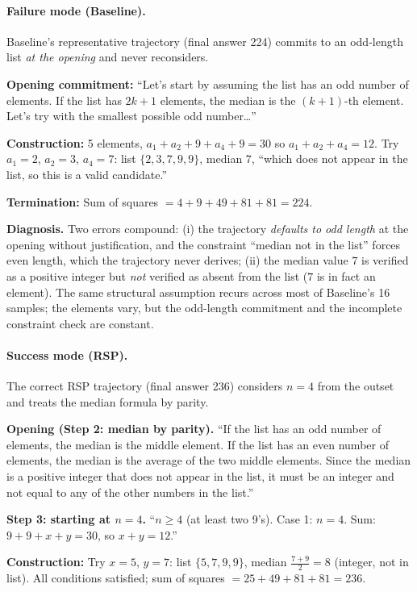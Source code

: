 \paragraph{Failure mode (Baseline).} Baseline's representative trajectory (final answer 224) commits to an odd-length list \emph{at the opening} and never reconsiders.

\begin{tcolorbox}[colback=gray!5, colframe=black!60, arc=3pt, boxrule=0.5pt, fontupper=\footnotesize, breakable, title={Baseline trajectory (final answer 224) --- excerpts}]
\textbf{Opening commitment:} ``Let's start by assuming the list has an odd number of elements. If the list has $2k+1$ elements, the median is the $(k+1)$-th element. Let's try with the smallest possible odd number\dots''

\textbf{Construction:} 5 elements, $a_1 + a_2 + 9 + a_4 + 9 = 30$ so $a_1 + a_2 + a_4 = 12$. Try $a_1 = 2$, $a_2 = 3$, $a_4 = 7$: list $\{2, 3, 7, 9, 9\}$, median $7$, ``which does not appear in the list, so this is a valid candidate.''

\textbf{Termination:} Sum of squares $= 4 + 9 + 49 + 81 + 81 = \boxed{224}$.
\end{tcolorbox}

\textbf{Diagnosis.} Two errors compound: (i) the trajectory \emph{defaults to odd length} at the opening without justification, and the constraint ``median not in the list'' forces even length, which the trajectory never derives; (ii) the median value $7$ is verified as a positive integer but \emph{not} verified as absent from the list ($7$ is in fact an element). The same structural assumption recurs across most of Baseline's 16 samples; the elements vary, but the odd-length commitment and the incomplete constraint check are constant.

\paragraph{Success mode (RSP).} The correct RSP trajectory (final answer 236) considers $n = 4$ from the outset and treats the median formula by parity.

\begin{tcolorbox}[colback=gray!5, colframe=black!60, arc=3pt, boxrule=0.5pt, fontupper=\footnotesize, breakable, title={RSP trajectory (final answer 236) --- excerpts}]
\textbf{Opening (Step 2: median by parity).} ``If the list has an odd number of elements, the median is the middle element. If the list has an even number of elements, the median is the average of the two middle elements. Since the median is a positive integer that does not appear in the list, it must be an integer and not equal to any of the other numbers in the list.''

\textbf{Step 3: starting at $n = 4$.} ``$n \ge 4$ (at least two 9's). Case 1: $n = 4$. Sum: $9 + 9 + x + y = 30$, so $x + y = 12$.''

\textbf{Construction:} Try $x = 5$, $y = 7$: list $\{5, 7, 9, 9\}$, median $\tfrac{7+9}{2} = 8$ (integer, not in list). All conditions satisfied; sum of squares $= 25 + 49 + 81 + 81 = \boxed{236}$.
\end{tcolorbox}

